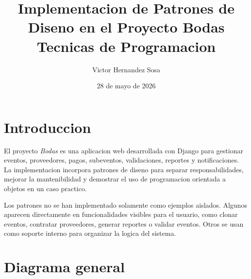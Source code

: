 \documentclass[12pt,a4paper]{article}
\title{\textbf{Implementacion de Patrones de Diseno en el Proyecto Bodas}\\
\large Tecnicas de Programacion}
\author{Victor Hernandez Sosa}
\date{28 de mayo de 2026}
\begin{document}
\maketitle
\tableofcontents
\newpage

\section{Introduccion}

El proyecto \textit{Bodas} es una aplicacion web desarrollada con Django para gestionar eventos, proveedores, pagos, subeventos, validaciones, reportes y notificaciones. La implementacion incorpora patrones de diseno para separar responsabilidades, mejorar la mantenibilidad y demostrar el uso de programacion orientada a objetos en un caso practico.

Los patrones no se han implementado solamente como ejemplos aislados. Algunos aparecen directamente en funcionalidades visibles para el usuario, como clonar eventos, contratar proveedores, generar reportes o validar eventos. Otros se usan como soporte interno para organizar la logica del sistema.

\section{Diagrama general}
\end{document}
